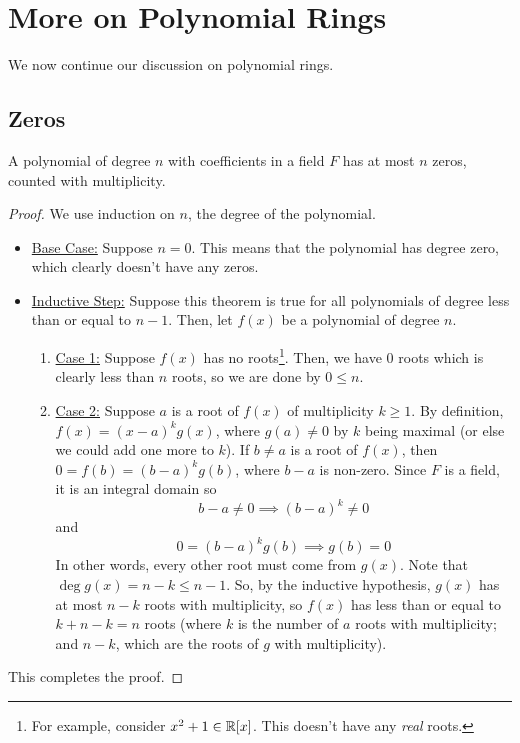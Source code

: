 \documentclass[letterpaper]{article}
\begin{document}
\section{More on Polynomial Rings}
We now continue our discussion on polynomial rings. 

\subsection{Zeros}
\begin{theorem}{}{}
    A polynomial of degree $n$ with coefficients in a field $F$ has at most $n$ zeros, counted with multiplicity. 
\end{theorem}

\begin{mdframed}[]
    \begin{proof}
        We use induction on $n$, the degree of the polynomial.
        \begin{itemize}
            \item \underline{Base Case:} Suppose $n = 0$. This means that the polynomial has degree zero, which clearly doesn't have any zeros.
            \item \underline{Inductive Step:} Suppose this theorem is true for all polynomials of degree less than or equal to $n - 1$. Then, let $f(x)$ be a polynomial of degree $n$.
            \begin{enumerate}
                \item \underline{Case 1:} Suppose $f(x)$ has no roots\footnote{For example, consider $x^2 + 1 \in \mathbb{R}[x]$. This doesn't have any \emph{real} roots.}. Then, we have $0$ roots which is clearly less than $n$ roots, so we are done by $0 \leq n$. 
                \item \underline{Case 2:} Suppose $a$ is a root of $f(x)$ of multiplicity $k \geq 1$. By definition, $f(x) =  (x - a)^k g(x)$, where $g(a) \neq 0$ by $k$ being maximal (or else we could add one more to $k$). If $b \neq a$ is a root of $f(x)$, then $0 = f(b) = (b - a)^k g(b)$, where $b - a$ is non-zero. Since $F$ is a field, it is an integral domain so
                \[b - a \neq 0 \implies (b - a)^k \neq 0\]
                and
                \[0 = (b - a)^k g(b) \implies g(b) = 0\]
                In other words, every other root must come from $g(x)$. Note that $\deg g(x) = n - k \leq n - 1$. So, by the inductive hypothesis, $g(x)$ has at most $n - k$ roots with multiplicity, so $f(x)$ has less than or equal to $k + n - k = n$ roots (where $k$ is the number of $a$ roots with multiplicity; and $n - k$, which are the roots of $g$ with multiplicity). 
            \end{enumerate}
        \end{itemize}
        This completes the proof. 
    \end{proof}
\end{mdframed}
\end{document}
